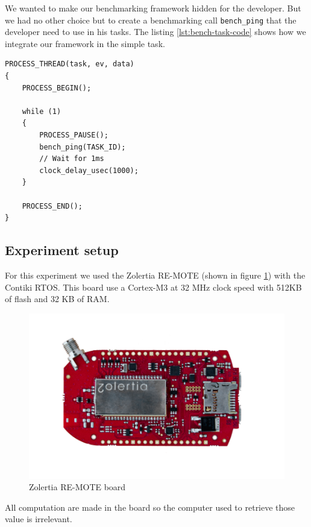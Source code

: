We wanted to make our benchmarking framework hidden for the developer.
But we had no other choice but to create a benchmarking call \texttt{bench\_ping} that the developer need to use in his tasks.
The listing \ref{lst:bench-task-code} shows how we integrate our framework in the simple task.

\begin{lstlisting}[style=CStyle, label={lst:bench-task-code}, caption={Source code of the task with benchmarking framework calls}]
PROCESS_THREAD(task, ev, data)
{
    PROCESS_BEGIN();

    while (1)
    {
        PROCESS_PAUSE();
        bench_ping(TASK_ID);
        // Wait for 1ms
        clock_delay_usec(1000);
    }

    PROCESS_END();
}
\end{lstlisting}

\subsection{Experiment setup}

For this experiment we used the Zolertia RE-MOTE (shown in figure \ref{fig:remote}) with the Contiki RTOS.
This board use a Cortex-M3 at 32 MHz clock speed with 512KB of flash and 32 KB of RAM.

\begin{figure}
  \centering
  \includegraphics[scale=0.7]{assets/remote.png}
  \caption{\label{fig:remote}Zolertia RE-MOTE board}
\end{figure}

All computation are made in the board so the computer used to retrieve those value is irrelevant.